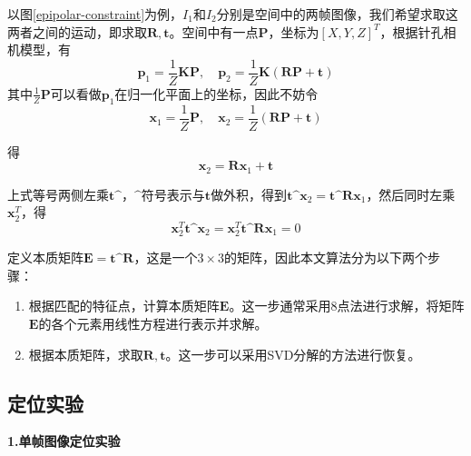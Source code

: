 以图\ref{epipolar-constraint}为例，$I_1$和$I_2$分别是空间中的两帧图像，我们希望求取这两者之间的运动，即求取$\boldsymbol{R}, \boldsymbol{t}$。空间中有一点$\boldsymbol{P}$，坐标为$[X,Y,Z]^T$，根据针孔相机模型，有
\begin{equation}
	\boldsymbol{p}_1=\frac{1}{Z}\boldsymbol{KP}, \quad \boldsymbol{p}_2=\frac{1}{Z}\boldsymbol{K(RP+t)}
\end{equation}
其中$\frac{1}{Z}\boldsymbol{P}$可以看做$\boldsymbol{p}_1$在归一化平面上的坐标，因此不妨令
\begin{equation}
	\boldsymbol{x}_1 = \frac{1}{Z}\boldsymbol{P}, \quad\boldsymbol{x}_2=\frac{1}{Z}(\boldsymbol{R}\boldsymbol{P}+\boldsymbol{t})
\end{equation}

得
\begin{equation}
	\boldsymbol{x}_2=\boldsymbol{R}\boldsymbol{x}_1+\boldsymbol{t}
\end{equation}

上式等号两侧左乘$\boldsymbol{t}\^{}$，$\^{}$符号表示与$\boldsymbol{t}$做外积，得到$\boldsymbol{t}\^{}\boldsymbol{x}_2=\boldsymbol{t}\^{}\boldsymbol{Rx}_1$，然后同时左乘$\boldsymbol{x}_2^T$，得
\begin{equation}
	\boldsymbol{x}_2^T\boldsymbol{t}\^{}\boldsymbol{x}_2=\boldsymbol{x}_2^T\boldsymbol{t}\^{}\boldsymbol{Rx}_1 = 0
\end{equation}


定义本质矩阵$\boldsymbol{E}=\boldsymbol{t}\^{}\boldsymbol{R} $，这是一个$3\times 3$的矩阵，因此本文算法分为以下两个步骤：
\begin{enumerate}
	\item 根据匹配的特征点，计算本质矩阵$\boldsymbol{E}$。这一步通常采用8点法\cite{hartley1997defense, longuet1981computer}进行求解，将矩阵$\boldsymbol{E}$的各个元素用线性方程进行表示并求解。
	\item 根据本质矩阵，求取$\boldsymbol{R}, \boldsymbol{t}$。这一步可以采用SVD分解的方法进行恢复\cite{wang2000svd}。
\end{enumerate}

\subsection{定位实验}
\textbf{1.单帧图像定位实验}

